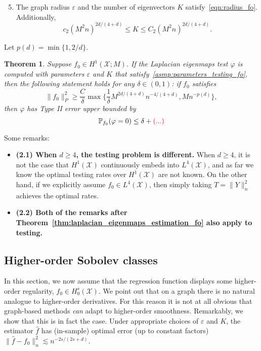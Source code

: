 \documentclass{article}
\newcommand{\1}{\mathbf{1}}
\newcommand{\Leb}{L}
\newcommand{\mc}[1]{\mathcal{#1}}
\newcommand{\Pbb}{\mathbb{P}}
\newcommand{\wh}[1]{\widehat{#1}}
\theoremstyle{alden}
\theoremstyle{aldenthm}
\newtheorem{theorem}{Theorem}
\theoremstyle{definition}
\theoremstyle{remark}
\begin{document}
\begin{enumerate}[label=(A\arabic*)]
	\setcounter{enumi}{4}
	\item 
	\label{asmp:parameters_testing_fo}
	The graph radius $\varepsilon$ and the number of eigenvectors $K$ satisfy~\eqref{eqn:radius_fo}. Additionally,
	\begin{equation}
	\label{eqn:eigenvector_testing_fo}
	c_2 (M^2 n)^{2d/(4 + d)}\leq K \leq C_2 (M^2 n)^{2d/(4 + d)}.
	\end{equation}
\end{enumerate}
Let $p(d) = \min\{1,2/d\}$.
\begin{theorem}
	\label{thm:laplacian_eigenmaps_testing_fo}
	Suppose $f_0 \in H^1(\mc{X};M)$. If the Laplacian eigenmaps test $\varphi$ is computed with parameters $\varepsilon$ and $K$ that satisfy~\ref{asmp:parameters_testing_fo}, then the following statement holds for any $\delta \in (0,1)$: if $f_0$ satisfies
	\begin{equation}
	\label{eqn:laplacian_eigenmaps_testing_criticalradius_fo}
	\|f_0\|_P^2 \geq \frac{C}{\delta} \max\biggl\{\frac{1}{\delta}M^{2d/(4 + d)}n^{-4/(4 + d)}, M n^{-p(d)}\biggr\},
	\end{equation}
	then $\varphi$ has Type II error upper bounded by 
	\begin{equation}
	\Pbb_{f_0}(\varphi = 0) \leq \delta + \textcolor{red}{(...)}
	\end{equation}
\end{theorem}
Some remarks:
\begin{itemize}
	\item \textbf{(2.1) When $d \geq 4$, the testing problem is different.} When $d \geq 4$, it is not the case that $H^1(\mc{X})$ continuously embeds into $\Leb^4(\mc{X})$, and as far we know the optimal testing rates over $H^1(\mc{X})$ are not known. On the other hand, if we explicitly assume $f_0 \in \Leb^4(\mc{X})$, then simply taking $T = \|Y\|_n^2$ achieves the optimal rates.
	\item \textbf{(2.2) Both of the remarks after Theorem~\ref{thm:laplacian_eigenmaps_estimation_fo} also apply to testing.}
\end{itemize}

\subsection{Higher-order Sobolev classes}
\label{sec:higher_order_sobolev_classes}
In this section, we now assume that the regression function displays some higher-order regularity, $f_0 \in H_0^s(\mc{X})$. We point out that on a graph there is no natural analogue to higher-order derivatives. For this reason it is not at all obvious that graph-based methods \emph{can} adapt to higher-order smoothness. Remarkably, we show that this is in fact the case. Under appropriate choices of $\varepsilon$ and $K$, the estimator $\wh{f}$ has (in-sample) optimal error (up to constant factors) $\|\wh{f} - f_0\|_n^2 \lesssim n^{-2s/(2s + d)}$. 
\end{document}
